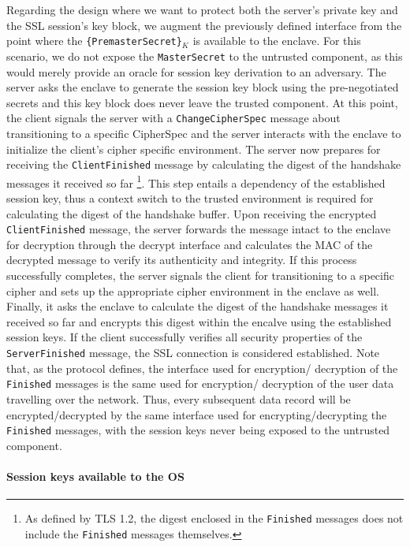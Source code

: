 \documentclass[../../main.tex]{subfiles}
\begin{document}
Regarding the design where we want to protect both the server's
private key and the SSL session's key block, we augment the previously
defined interface from the point where the
\texttt{\{PremasterSecret\}$_K$} is available to the enclave. For this
scenario, we do not expose the \texttt{MasterSecret} to the untrusted
component, as this would merely provide an oracle for session key
derivation to an adversary. The server asks the enclave to generate
the session key block using the pre-negotiated secrets and this key
block does never leave the trusted component. At this point, the
client signals the server with a \texttt{ChangeCipherSpec} message
about transitioning to a specific CipherSpec and the server interacts
with the enclave to initialize the client's cipher specific
environment. The server now prepares for receiving the
\texttt{ClientFinished} message by calculating the digest of the
handshake messages it received so far \footnote{As defined by TLS 1.2,
  the digest enclosed in the \texttt{Finished} messages does not
  include the \texttt{Finished} messages themselves.}. This step
entails a dependency of the established session key, thus a context
switch to the trusted environment is required for calculating the
digest of the handshake buffer. Upon receiving the encrypted
\texttt{ClientFinished} message, the server forwards the message
intact to the enclave for decryption through the decrypt interface and
calculates the MAC of the decrypted message to verify its authenticity
and integrity. If this process successfully completes, the server
signals the client for transitioning to a specific cipher and sets up
the appropriate cipher environment in the enclave as well. Finally, it
asks the enclave to calculate the digest of the handshake messages it
received so far and encrypts this digest within the encalve using the
established session keys. If the client successfully verifies all
security properties of the \texttt{ServerFinished} message, the SSL
connection is considered established. Note that, as the protocol
defines, the interface used for encryption/ decryption of the
\texttt{Finished} messages is the same used for encryption/ decryption
of the user data travelling over the network. Thus, every subsequent
data record will be encrypted/decrypted by the same interface used for
encrypting/decrypting the \texttt{Finished} messages, with the session
keys never being exposed to the untrusted component.

\paragraph{Session keys available to the OS}
\end{document}
